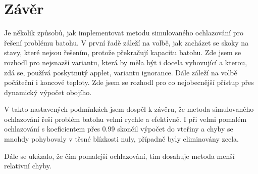 \documentclass[12pt,a4paper]{article}
\begin{document}
\section{Závěr}

Je několik způsobů, jak implementovat metodu simulovaného ochlazování pro řešení problému batohu. V první řadě záleží na volbě, jak zacházet se skoky na stavy, které nejsou řešením, protože překračují kapacitu batohu. Zde jsem se rozhodl pro nejsnazší variantu, která by měla být i docela vyhovující a kterou, zdá se, používá poskytnutý applet, variantu ignorance. Dále záleží na volbě počáteční i koncové teploty. Zde jsem se rozhodl pro co nejobecnější přístup přes dynamický výpočet obojího.

V takto nastavených podmínkách jsem dospěl k závěru, že metoda simulovaného ochlazování řeší problém batohu velmi rychle a efektivně. I při velmi pomalém ochlazování s koeficientem přes 0.99 skončil výpočet do vteřiny a chyby se mnohdy pohybovaly v těsné blízkosti nuly, případně byly eliminovány zcela.

Dále se ukázalo, že čím pomalejší ochlazování, tím dosahuje metoda menší relativní chyby.
\end{document}
